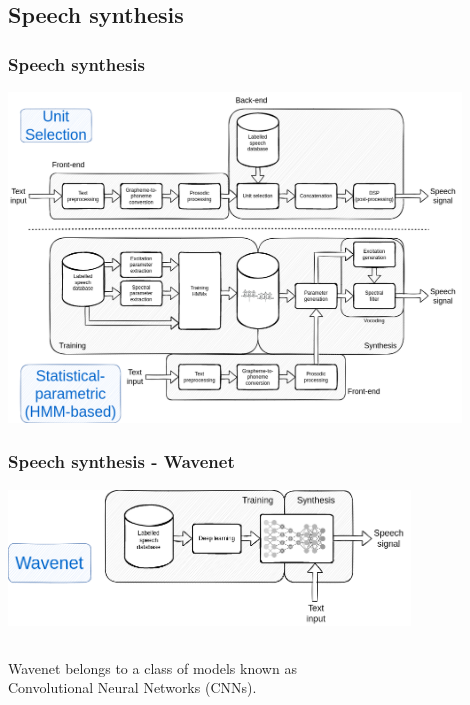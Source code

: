\documentclass[a4paper,9pt]{beamer}
\theoremstyle{mytheoremstyle}
\begin{document}
\subsection{Speech synthesis}
\begin{frame}
\frametitle{Speech synthesis}
\includegraphics[width=0.9\textwidth]{res/speech_synthesis_clunit_hmm.png}
\end{frame}

\begin{frame}
\frametitle{Speech synthesis - Wavenet}
\includegraphics[width=0.8\textwidth]{res/speech_synthesis_wavenet.png}
\begin{columns}
\begin{exampleblock}{}
Wavenet belongs to a class of models known as\\
Convolutional Neural Networks (CNNs).
\end{exampleblock}
\end{columns}
\end{frame}
\end{document}
